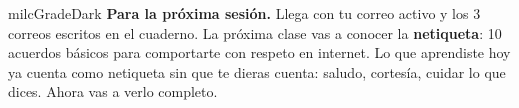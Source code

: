 \documentclass[11pt,letterpaper]{article}
\begin{document}
\begin{infoband}{milcGradeDark}
\textbf{Para la próxima sesión.} Llega con tu correo activo y los 3 correos escritos en el cuaderno. La próxima clase vas a conocer la \textbf{netiqueta}: 10 acuerdos básicos para comportarte con respeto en internet. Lo que aprendiste hoy ya cuenta como netiqueta sin que te dieras cuenta: saludo, cortesía, cuidar lo que dices. Ahora vas a verlo completo.
\end{infoband}
\end{document}
